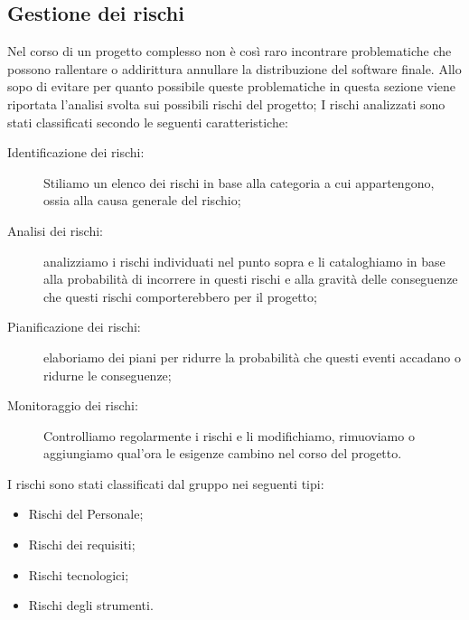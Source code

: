\documentclass[../piano-di-progetto.tex]{subfiles}
\begin{document}
	\subsection{Gestione dei rischi}%
  \label{sub:gestione_dei_rischi}
  Nel corso di un progetto complesso non è così raro incontrare problematiche che possono rallentare o addirittura annullare la distribuzione del software finale.
  Allo sopo di evitare per quanto possibile queste problematiche in questa sezione viene riportata l'analisi svolta sui possibili rischi del progetto; I rischi analizzati sono stati classificati secondo le seguenti caratteristiche:
  \begin{description}
      \item[Identificazione dei rischi:] Stiliamo un elenco dei rischi in base alla categoria a cui appartengono, ossia alla causa generale del rischio;
      \item[Analisi dei rischi:] analizziamo i rischi individuati nel punto sopra e li cataloghiamo in base alla probabilità di incorrere in questi rischi e alla gravità delle conseguenze che questi rischi comporterebbero per il progetto;
      \item[Pianificazione dei rischi:] elaboriamo dei piani per ridurre la probabilità che questi eventi accadano o ridurne le conseguenze;
      \item[Monitoraggio dei rischi:] Controlliamo regolarmente i rischi e li modifichiamo, rimuoviamo o aggiungiamo qual'ora le esigenze cambino nel corso del progetto.
    \end{description}
    I rischi sono stati classificati dal gruppo nei seguenti tipi:
    \begin{itemize}
      \item Rischi del Personale;
      \item Rischi dei requisiti;
      \item Rischi tecnologici;
      \item Rischi degli strumenti.
    \end{itemize}
\end{document}
